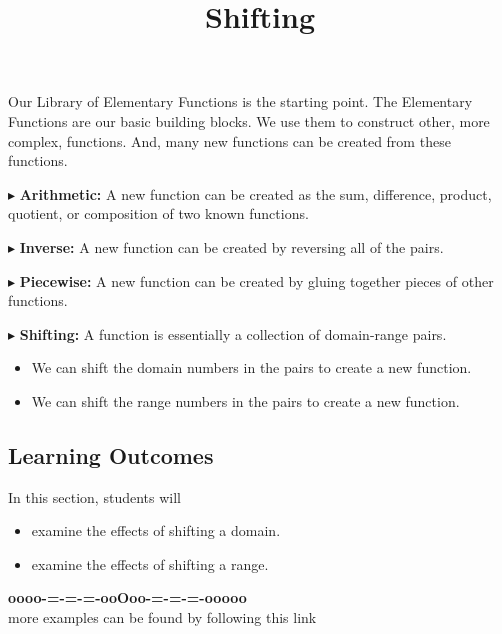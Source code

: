 \documentclass{ximera}
\title{Shifting}
\begin{document}
\begin{abstract}
\end{abstract}
\maketitle



Our Library of Elementary Functions is the starting point.  The Elementary Functions are our basic building blocks.  We use them to construct other, more complex, functions.  And, many new functions can be created from these functions.


$\blacktriangleright$ \textbf{Arithmetic:} A new function can be created as the sum, difference, product, quotient, or composition of two known functions. 

$\blacktriangleright$ \textbf{Inverse:} A new function can be created by reversing all of the pairs. 

$\blacktriangleright$ \textbf{Piecewise:} A new function can be created by gluing together pieces of other functions.  


$\blacktriangleright$ \textbf{Shifting:}  A function is essentially a collection of domain-range pairs.  


\begin{itemize}
\item We can shift the domain numbers in the pairs to create a new function.
\item We can shift the range numbers in the pairs to create a new function.
\end{itemize}




\subsection*{Learning Outcomes}


\begin{sectionOutcomes}
In this section, students will 

\begin{itemize}
\item examine the effects of shifting a domain.
\item examine the effects of shifting a range.
\end{itemize}
\end{sectionOutcomes}











\begin{center}
\textbf{\textcolor{green!50!black}{oooo-=-=-=-ooOoo-=-=-=-ooooo}} \\

more examples can be found by following this link\\ 

\end{center}
\end{document}
